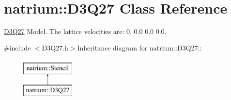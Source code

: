 \hypertarget{classnatrium_1_1D3Q27}{
\section{natrium::D3Q27 Class Reference}
\label{classnatrium_1_1D3Q27}
}


\hyperlink{classnatrium_1_1D3Q27}{D3Q27} Model. The lattice velocities are: 0. 0.0 0.0 0.0.  


{\ttfamily \#include $<$D3Q27.h$>$}Inheritance diagram for natrium::D3Q27::\begin{figure}[H]
\begin{center}
\leavevmode
\includegraphics[height=2cm]{classnatrium_1_1D3Q27}
\end{center}
\end{figure}
